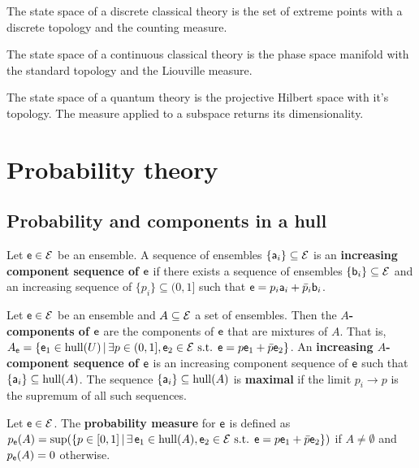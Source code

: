 \begin{conj}
	The state space of a discrete classical theory is the set of extreme points with a discrete topology and the counting measure.
\end{conj}

\begin{conj}
	The state space of a continuous classical theory is the phase space manifold with the standard topology and the Liouville measure.
\end{conj}

\begin{conj}
	The state space of a quantum theory is the projective Hilbert space with it's topology. The measure applied to a subspace returns its dimensionality.
\end{conj}


\section{Probability theory}

\subsection{Probability and components in a hull}

\begin{defn}
	Let $\ens \in \Ens$ be an ensemble. A sequence of ensembles $\{\ens[a]_i\} \subseteq \Ens$ is an \textbf{increasing component sequence of $\ens$} if there exists a sequence of ensembles $\{\ens[b]_i\} \subseteq \Ens$ and an increasing sequence of $\{p_i\} \subseteq (0,1]$ such that $\ens = p_i \ens[a]_i + \bar{p}_i \ens[b]_i$.
\end{defn}

\begin{defn}
	Let $\ens \in \Ens$ be an ensemble and $A \subseteq \Ens$ a set of ensembles. Then the \textbf{$A$-components of $\ens$} are the components of $\ens$ that are mixtures of $A$. That is, $A_{\ens} = \{ \ens_1 \in \hull(U) \, | \, \exists p \in (0,1], \ens_2 \in \Ens \text{ s.t. } \ens = p \ens_1 + \bar{p} \ens_2  \}$. An \textbf{increasing $A$-component sequence of $\ens$} is an increasing component sequence of $\ens$ such that $\{\ens[a]_i\} \subseteq \hull(A)$. The sequence $\{\ens[a]_i\} \subseteq \hull(A)$ is \textbf{maximal} if the limit $p_i \to p$ is the supremum of all such sequences.
\end{defn}

\begin{defn}
	Let $\ens \in \Ens$. The \textbf{probability measure} for $\ens$ is defined as $p_{\ens}(A) = \sup(\{ p \in [0,1] \, | \, \exists \, \ens_1 \in \hull(A), \ens_2 \in \Ens \text{ s.t. }  \ens = p \ens_1 + \bar{p} \ens_2 \})$ if $A \neq \emptyset$ and $p_{\ens}(A) = 0$ otherwise.
\end{defn}


